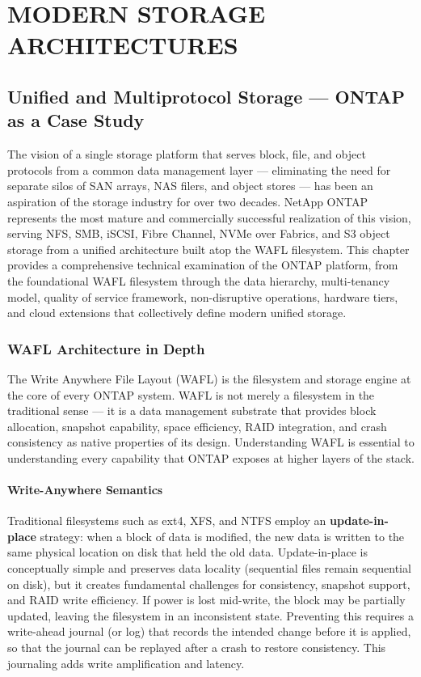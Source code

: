 \part{MODERN STORAGE ARCHITECTURES}

\chapter{Unified and Multiprotocol Storage --- ONTAP as a Case Study}
\label{ch:14}

The vision of a single storage platform that serves block, file, and object protocols from a common data management layer --- eliminating the need for separate silos of SAN arrays, NAS filers, and object stores --- has been an aspiration of the storage industry for over two decades. NetApp ONTAP represents the most mature and commercially successful realization of this vision, serving NFS, SMB, iSCSI, Fibre Channel, NVMe over Fabrics, and S3 object storage from a unified architecture built atop the WAFL filesystem. This chapter provides a comprehensive technical examination of the ONTAP platform, from the foundational WAFL filesystem through the data hierarchy, multi-tenancy model, quality of service framework, non-disruptive operations, hardware tiers, and cloud extensions that collectively define modern unified storage.

\section{WAFL Architecture in Depth}

The Write Anywhere File Layout (WAFL) is the filesystem and storage engine at the core of every ONTAP system. WAFL is not merely a filesystem in the traditional sense --- it is a data management substrate that provides block allocation, snapshot capability, space efficiency, RAID integration, and crash consistency as native properties of its design. Understanding WAFL is essential to understanding every capability that ONTAP exposes at higher layers of the stack.

\subsection{Write-Anywhere Semantics}

Traditional filesystems such as ext4, XFS, and NTFS employ an \textbf{update-in-place} strategy: when a block of data is modified, the new data is written to the same physical location on disk that held the old data. Update-in-place is conceptually simple and preserves data locality (sequential files remain sequential on disk), but it creates fundamental challenges for consistency, snapshot support, and RAID write efficiency. If power is lost mid-write, the block may be partially updated, leaving the filesystem in an inconsistent state. Preventing this requires a write-ahead journal (or log) that records the intended change before it is applied, so that the journal can be replayed after a crash to restore consistency. This journaling adds write amplification and latency.

